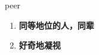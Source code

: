 
\begin{frame}
{\huge peer}
\begin{center}
\begin{enumerate}\Large
  \item \textbf{同等地位的人，同辈}
  \item \textbf{好奇地凝视}
\end{enumerate}
\end{center}
\end{frame}
